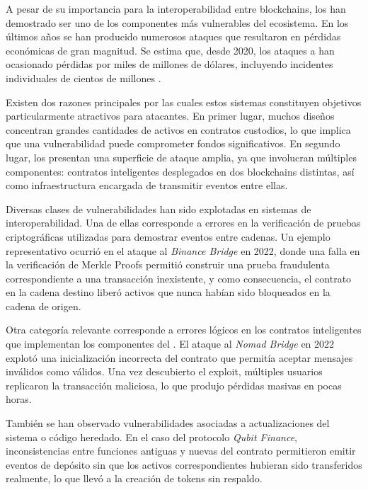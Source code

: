 
A pesar de su importancia para la interoperabilidad entre blockchains, los \Bridges han demostrado ser uno de los componentes más vulnerables del ecosistema. En los últimos años se han producido numerosos ataques que resultaron en pérdidas económicas de gran magnitud. Se estima que, desde 2020, los ataques a \Bridges han ocasionado pérdidas por miles de millones de dólares, incluyendo incidentes individuales de cientos de millones \cite{belenkov2025sokreviewcrosschainBridge}.

Existen dos razones principales por las cuales estos sistemas constituyen objetivos particularmente atractivos para atacantes. En primer lugar, muchos diseños concentran grandes cantidades de activos en contratos custodios, lo que implica que una vulnerabilidad puede comprometer fondos significativos. En segundo lugar, los \Bridges presentan una superficie de ataque amplia, ya que involucran múltiples componentes: contratos inteligentes desplegados en dos blockchains distintas, así como infraestructura \Offchain encargada de transmitir eventos entre ellas. 

Diversas clases de vulnerabilidades han sido explotadas en sistemas de interoperabilidad. Una de ellas corresponde a errores en la verificación de pruebas criptográficas utilizadas para demostrar eventos entre cadenas. Un ejemplo representativo ocurrió en el ataque al \emph{Binance Bridge} en 2022, donde una falla en la verificación de Merkle Proofs permitió construir una prueba fraudulenta correspondiente a una transacción inexistente, y como consecuencia, el contrato en la cadena destino liberó activos que nunca habían sido bloqueados en la cadena de origen.

Otra categoría relevante corresponde a errores lógicos en los contratos inteligentes que implementan los componentes del \Bridge. El ataque al \emph{Nomad Bridge} en 2022 explotó una inicialización incorrecta del contrato que permitía aceptar mensajes inválidos como válidos. Una vez descubierto el exploit, múltiples usuarios replicaron la transacción maliciosa, lo que produjo pérdidas masivas en pocas horas.

También se han observado vulnerabilidades asociadas a actualizaciones del sistema o código heredado. En el caso del protocolo \emph{Qubit Finance}, inconsistencias entre funciones antiguas y nuevas del contrato permitieron emitir eventos de depósito sin que los activos correspondientes hubieran sido transferidos realmente, lo que llevó a la creación de tokens sin respaldo.

